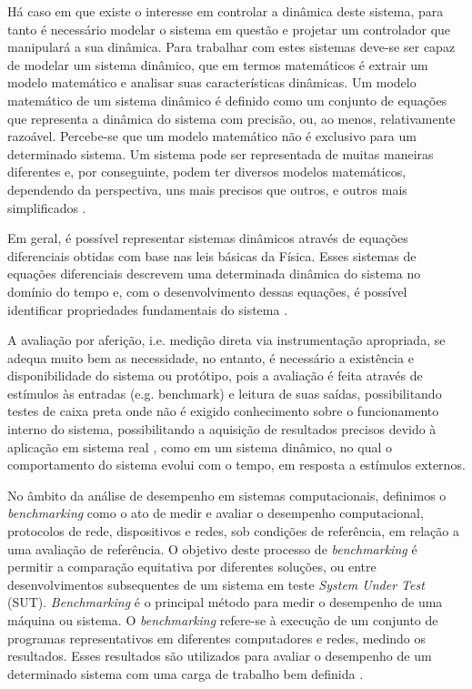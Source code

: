 Há caso em que existe o interesse em controlar a dinâmica deste sistema, para tanto é necessário modelar o sistema em questão e projetar um controlador que manipulará a sua dinâmica. Para trabalhar com estes sistemas deve-se ser capaz de modelar um sistema dinâmico, que em termos matemáticos é extrair um modelo matemático e analisar suas características dinâmicas. Um modelo matemático de um sistema dinâmico é definido como um conjunto de equações que representa a dinâmica do sistema com precisão, ou, ao menos, relativamente razoável. Percebe-se que um modelo matemático não é exclusivo para um determinado sistema. Um sistema pode ser representada de muitas maneiras diferentes e, por conseguinte, podem ter diversos modelos matemáticos, dependendo da perspectiva, uns mais precisos que outros, e outros mais simplificados \cite{Ogata2001}.

Em geral, é possível representar sistemas dinâmicos através de equações diferenciais obtidas com base nas leis básicas da Física. Esses sistemas de equações diferenciais descrevem uma determinada dinâmica do sistema no domínio do tempo e, com o desenvolvimento dessas equações, é possível identificar propriedades fundamentais do sistema \cite{Nobile2013}.


A avaliação por aferição, i.e. medição direta via instrumentação apropriada, se adequa muito bem as necessidade, no entanto, é necessário a existência e disponibilidade do sistema ou protótipo, pois a avaliação é feita através de estímulos às entradas (e.g. benchmark) e leitura de suas saídas, possibilitando testes de caixa preta onde não é exigido conhecimento sobre o funcionamento interno do sistema, possibilitando a aquisição de resultados precisos devido à aplicação em sistema real \cite{Nobile2013}, como em um sistema dinâmico, no qual o comportamento do sistema evolui com o tempo, em resposta a estímulos externos.

No âmbito da análise de desempenho em sistemas computacionais, definimos o \textit{benchmarking} como o ato de medir e avaliar o desempenho computacional, protocolos de rede, dispositivos e redes, sob condições de referência, em relação a uma avaliação de referência. O objetivo deste processo de \textit{benchmarking} é permitir a comparação equitativa por diferentes soluções, ou entre desenvolvimentos subsequentes de um sistema em teste \textit{System Under Test} (SUT). \textit{Benchmarking} é o principal método para medir o desempenho de uma máquina ou sistema. O \textit{benchmarking} refere-se à execução de um conjunto de programas representativos em diferentes computadores e redes, medindo os resultados. Esses resultados são utilizados para avaliar o desempenho de um determinado sistema com uma carga de trabalho bem definida \cite{Menasce2001}.


